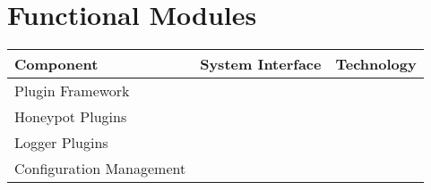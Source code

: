 \section*{\color{NavyBlue}Functional Modules}

\large

\begin{center}
\begin{tabularx}{\linewidth}{X | X | X}
\toprule
\textbf{Component} & \textbf{System Interface} & \textbf{Technology} \\
\midrule
Plugin Framework & &  \\ \hline
Honeypot Plugins & &  \\ \hline
Logger Plugins & & \\ \hline
Configuration Management & & \\
\bottomrule
\end{tabularx}
\end{center}

